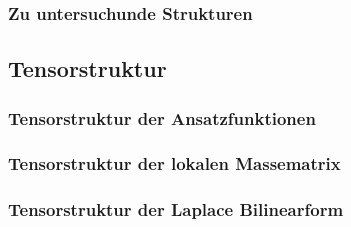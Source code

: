 \begin{frame}
\frametitle{Zu untersuchunde Strukturen}
\end{frame}



\subsection{Tensorstruktur}
\begin{frame}
\frametitle{Tensorstruktur der Ansatzfunktionen}
\end{frame}

\begin{frame}
\frametitle{Tensorstruktur der lokalen Massematrix}
\end{frame}


\begin{frame}
\frametitle{Tensorstruktur der Laplace Bilinearform}

\end{frame}